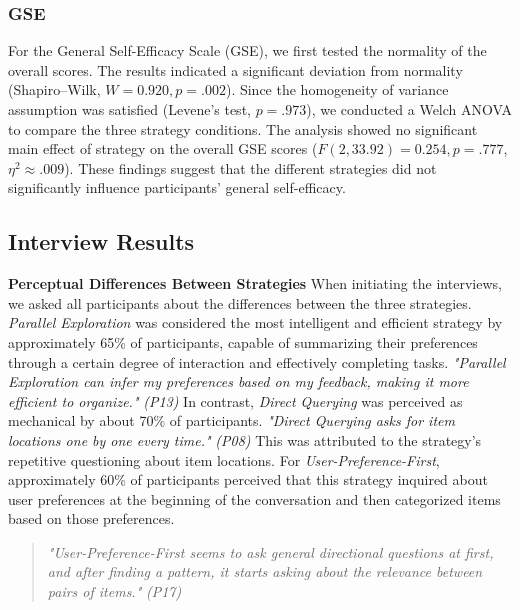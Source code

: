 \documentclass[sigconf,authordraft]{acmart}
\newcommand{\smallitalic}[1]{{\small\textit{#1}}}
\newcommand{\strategy}[1]{{\textit{#1}}}
\begin{document}
\subsubsection{GSE}
For the General Self-Efficacy Scale (GSE), we first tested the normality of the overall scores. The results indicated a significant deviation from normality (Shapiro--Wilk, $W = 0.920, p = .002$). Since the homogeneity of variance assumption was satisfied (Levene’s test, $p = .973$), we conducted a Welch ANOVA to compare the three strategy conditions. The analysis showed no significant main effect of strategy on the overall GSE scores ($F(2,33.92) = 0.254, p = .777$, $\eta^2 \approx .009$). These findings suggest that the different strategies did not significantly influence participants’ general self-efficacy.


\subsection{Interview Results}

\textbf{Perceptual Differences Between Strategies}
When initiating the interviews, we asked all participants about the differences between the three strategies. \strategy{Parallel Exploration} was considered the most intelligent and efficient strategy by approximately 65\% of participants, capable of summarizing their preferences through a certain degree of interaction and effectively completing tasks. \smallitalic{"Parallel Exploration can infer my preferences based on my feedback, making it more efficient to organize."} \smallitalic{(P13)} In contrast, \strategy{Direct Querying} was perceived as mechanical by about 70\% of participants. \smallitalic{"Direct Querying asks for item locations one by one every time."} \smallitalic{(P08)} This was attributed to the strategy's repetitive questioning about item locations.
For \strategy{User-Preference-First}, approximately 60\% of participants perceived that this strategy inquired about user preferences at the beginning of the conversation and then categorized items based on those preferences.
\begin{quote}
\smallitalic{"User-Preference-First seems to ask general directional questions at first, and after finding a pattern, it starts asking about the relevance between pairs of items."} \smallitalic{(P17)}
\end{quote}
\end{document}
